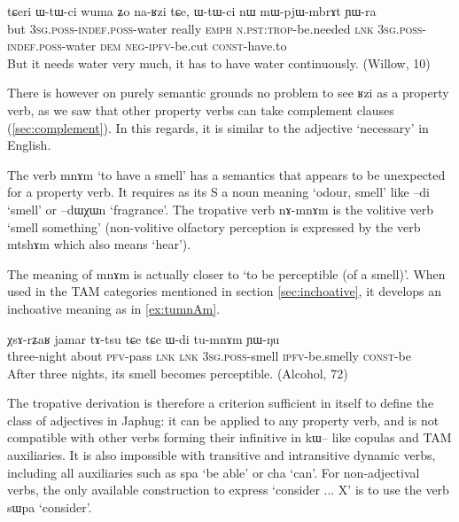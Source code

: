 \documentclass[oldfontcommands,oneside,a4paper,11pt]{article}
\newcommand{\ipa}[1]{{\phon \mbox{#1}}} %
\begin{document}
\begin{exe}
\ex \label{ex:naʁzi}
\gll
\ipa{tɕeri} 	\ipa{ɯ-tɯ-ci} 	\ipa{wuma} 	\ipa{ʑo} 	\ipa{na-ʁzi} 	\ipa{tɕe,} 	\ipa{ɯ-tɯ-ci} 	\ipa{nɯ} 	\ipa{mɯ-pjɯ-mbrɤt} 	\ipa{ɲɯ-ra} \\
but \textsc{3sg.poss-indef.poss}-water really \textsc{emph} \textsc{n.pst:trop}-be.needed \textsc{lnk}  \textsc{3sg.poss-indef.poss}-water  \textsc{dem} \textsc{neg-ipfv}-be.cut \textsc{const}-have.to \\
\glt But it needs water very much, it has to have water continuously. (Willow, 10)
\end{exe}

There is however on purely semantic grounds no problem to see \ipa{ʁzi} as a property verb, as we saw that other property verbs can take complement clauses (\ref{sec:complement}). In this regards, it is similar to the adjective   `necessary' in English.

The verb   \ipa{mnɤm} `to have a smell' has a semantics that appears to be unexpected for a property verb. It requires as its S a noun meaning `odour, smell' like \ipa{--di} `smell' or \ipa{--dɯχɯn} `fragrance'. The tropative verb \ipa{nɤ-mnɤm} is the volitive verb `smell something' (non-volitive olfactory perception is expressed by the verb \ipa{mtshɤm} which also means `hear'). 

The meaning of   \ipa{mnɤm} is actually closer to `to be perceptible (of a smell)'. When used in the TAM categories mentioned  in section \ref{sec:inchoative}, it develops an inchoative meaning as in \ref{ex:tumnAm}.
 \begin{exe}
\ex \label{ex:tumnAm}
\gll
 \ipa{χsɤ-rʑaʁ} 	\ipa{jamar} 	\ipa{tɤ-tsu} 	\ipa{tɕe} 	\ipa{tɕe} 	\ipa{ɯ-di} 	\ipa{tu-mnɤm} 	\ipa{ɲɯ-ŋu} \\
 three-night about \textsc{pfv}-pass \textsc{lnk}  \textsc{lnk}  \textsc{3sg.poss}-smell \textsc{ipfv}-be.smelly \textsc{const}-be \\
 \glt After three nights, its smell becomes perceptible.  (Alcohol, 72)
\end{exe}

The tropative derivation is therefore a criterion sufficient in itself to define the class of adjectives in Japhug: it can be applied to any property verb, and is not compatible with other verbs forming their infinitive in \ipa{kɯ--} like copulas and TAM auxiliaries. It is also impossible with transitive and intransitive dynamic verbs, including all auxiliaries such as \ipa{spa} `be able' or \ipa{cha} `can'. For non-adjectival verbs, the only available construction to express `consider ... X' is to use the verb \ipa{sɯpa} `consider'.
 
\end{document}
